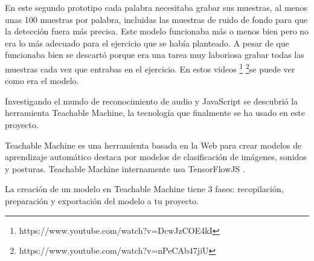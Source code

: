 En este segundo prototipo cada palabra necesitaba grabar sus muestras, al menos unas 100 muestras por palabra, incluidas las muestras de ruido de fondo para que la detección fuera más precisa. Este modelo funcionaba más o menos bien pero no era lo más adecuado para el ejercicio que se había planteado. A pesar de que funcionaba bien se descartó porque era una tarea muy laboriosa grabar todas las muestras cada vez que entrabas en el ejercicio. 
En estos videos \footnote{https://www.youtube.com/watch?v=DcwJzCOE4kI}
\footnote{https://www.youtube.com/watch?v=nPeCAb47jiU}se puede ver  como era el modelo.

Investigando el mundo de reconocimiento de audio y JavaScript se descubrió la herramienta Teachable Machine, la tecnología  que finalmente se ha usado en este proyecto.

Teachable Machine es una herramienta basada en la Web para crear modelos de aprendizaje automático destaca por modelos de clasificación de imágenes, sonidos y posturas. Teachable Machine internamente usa TensorFlowJS . 

La creación de un modelo en Teachable Machine tiene 3 fases: recopilación, preparación y exportación del modelo a tu proyecto.

